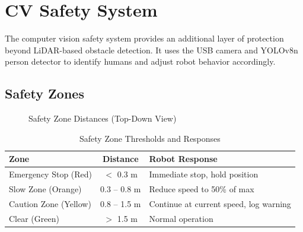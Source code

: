 \section{CV Safety System}
\label{sec:cv-safety}

The computer vision safety system provides an additional layer of protection beyond LiDAR-based obstacle detection. It uses the USB camera and YOLOv8n person detector to identify humans and adjust robot behavior accordingly.

\subsection{Safety Zones}

\begin{figure}[H]
\centering
{}
\caption{Safety Zone Distances (Top-Down View)}
\end{figure}

\begin{table}[H]
\centering
\caption{Safety Zone Thresholds and Responses}
\begin{tabular}{|l|c|l|}
\hline
\textbf{Zone} & \textbf{Distance} & \textbf{Robot Response} \\
\hline
Emergency Stop (Red) & $<$ 0.3 m & Immediate stop, hold position \\
\hline
Slow Zone (Orange) & 0.3 -- 0.8 m & Reduce speed to 50\% of max \\
\hline
Caution Zone (Yellow) & 0.8 -- 1.5 m & Continue at current speed, log warning \\
\hline
Clear (Green) & $>$ 1.5 m & Normal operation \\
\hline
\end{tabular}
\end{table}

